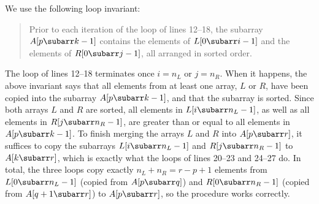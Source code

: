 We use the following loop invariant:
\begin{quote}
    Prior to each iteration of the  loop of lines 12--18, the subarray $A[p\subarr k-1]$ contains the elements of $L[0\subarr i-1]$ and the elements of $R[0\subarr j-1]$, all arranged in sorted order.
\end{quote}

The  loop of lines 12--18 terminates once $i=n_L$ or $j=n_R$.
When it happens, the above invariant says that all elements from at least one array, $L$ or $R$, have been copied into the subarray $A[p\subarr k-1]$, and that the subarray is sorted.
Since both arrays $L$ and $R$ are sorted, all elements in $L[i\subarr n_L-1]$, as well as all elements in $R[j\subarr n_R-1]$, are greater than or equal to all elements in $A[p\subarr k-1]$.
To finish merging the arrays $L$ and $R$ into $A[p\subarr r]$, it suffices to copy the subarrays $L[i\subarr n_L-1]$ and $R[j\subarr n_R-1]$ to $A[k\subarr r]$, which is exactly what the  loops of lines 20--23 and 24--27 do.
In total, the three  loops copy exactly $n_L+n_R=r-p+1$ elements from $L[0\subarr n_L-1]$ (copied from $A[p\subarr q]$) and $R[0\subarr n_R-1]$ (copied from $A[q+1\subarr r]$) to $A[p\subarr r]$, so the  procedure works correctly.
